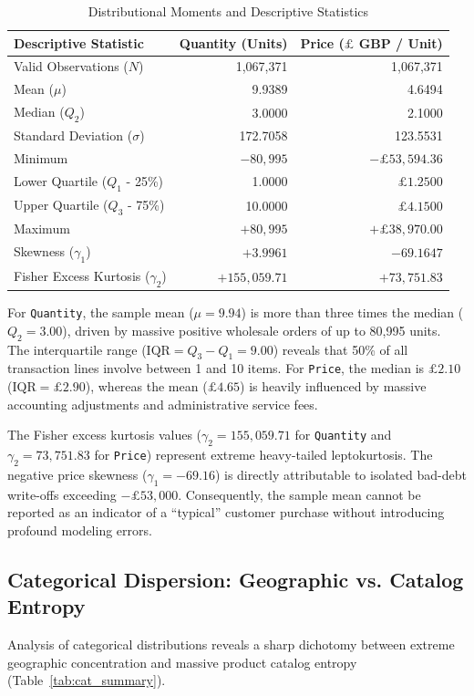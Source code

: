 \documentclass[journal,10pt,twocolumn]{IEEEtran}
\begin{document}
\begin{table}[htbp]
\caption{Distributional Moments and Descriptive Statistics}
\label{tab:desc_stats}
\centering
\begin{tabularx}{\columnwidth}{Xrr}
\toprule
\textbf{Descriptive Statistic} & \textbf{Quantity (Units)} & \textbf{Price ($\pounds$ GBP / Unit)} \\
\midrule
Valid Observations ($N$) & 1,067,371 & 1,067,371 \\
Mean ($\mu$) & 9.9389 & 4.6494 \\
Median ($Q_2$) & 3.0000 & 2.1000 \\
Standard Deviation ($\sigma$) & 172.7058 & 123.5531 \\
Minimum & $-80,995$ & $-\pounds 53,594.36$ \\
Lower Quartile ($Q_1$ - 25\%) & 1.0000 & $\pounds 1.2500$ \\
Upper Quartile ($Q_3$ - 75\%) & 10.0000 & $\pounds 4.1500$ \\
Maximum & $+80,995$ & $+\pounds 38,970.00$ \\
Skewness ($\gamma_1$) & $+3.9961$ & $-69.1647$ \\
Fisher Excess Kurtosis ($\gamma_2$) & $+155,059.71$ & $+73,751.83$ \\
\bottomrule
\end{tabularx}
\end{table}

For \texttt{Quantity}, the sample mean ($\mu = 9.94$) is more than three times the median ($Q_2 = 3.00$), driven by massive positive wholesale orders of up to 80,995 units. The interquartile range ($\text{IQR} = Q_3 - Q_1 = 9.00$) reveals that 50\% of all transaction lines involve between 1 and 10 items. For \texttt{Price}, the median is $\pounds 2.10$ ($\text{IQR} = \pounds 2.90$), whereas the mean ($\pounds 4.65$) is heavily influenced by massive accounting adjustments and administrative service fees.

The Fisher excess kurtosis values ($\gamma_2 = 155,059.71$ for \texttt{Quantity} and $\gamma_2 = 73,751.83$ for \texttt{Price}) represent extreme heavy-tailed leptokurtosis. The negative price skewness ($\gamma_1 = -69.16$) is directly attributable to isolated bad-debt write-offs exceeding $-\pounds 53,000$. Consequently, the sample mean cannot be reported as an indicator of a ``typical'' customer purchase without introducing profound modeling errors.

\subsection{Categorical Dispersion: Geographic vs. Catalog Entropy}
Analysis of categorical distributions reveals a sharp dichotomy between extreme geographic concentration and massive product catalog entropy (Table~\ref{tab:cat_summary}).
\end{document}
